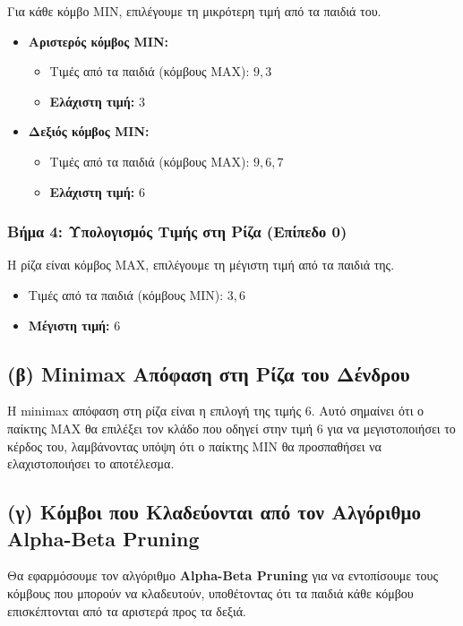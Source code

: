 \documentclass{article}
\begin{document}
Για κάθε κόμβο MIN, επιλέγουμε τη μικρότερη τιμή από τα παιδιά του.

\begin{itemize}
    \item \textbf{Αριστερός κόμβος MIN:}
    \begin{itemize}
        \item Τιμές από τα παιδιά (κόμβους MAX): \(9, 3\)
        \item \textbf{Ελάχιστη τιμή:} \(3\)
    \end{itemize}
    \item \textbf{Δεξιός κόμβος MIN:}
    \begin{itemize}
        \item Τιμές από τα παιδιά (κόμβους MAX): \(9, 6, 7\)
        \item \textbf{Ελάχιστη τιμή:} \(6\)
    \end{itemize}
\end{itemize}

\subsubsection*{Βήμα 4: Υπολογισμός Τιμής στη Ρίζα (Επίπεδο 0)}

Η ρίζα είναι κόμβος MAX, επιλέγουμε τη μέγιστη τιμή από τα παιδιά της.

\begin{itemize}
    \item Τιμές από τα παιδιά (κόμβους MIN): \(3, 6\)
    \item \textbf{Μέγιστη τιμή:} \(6\)
\end{itemize}

\subsection*{(β) Minimax Απόφαση στη Ρίζα του Δένδρου}

Η minimax απόφαση στη ρίζα είναι η επιλογή της τιμής \(6\). Αυτό σημαίνει ότι ο παίκτης MAX θα επιλέξει τον κλάδο που οδηγεί στην τιμή \(6\) για να μεγιστοποιήσει το κέρδος του, λαμβάνοντας υπόψη ότι ο παίκτης MIN θα προσπαθήσει να ελαχιστοποιήσει το αποτέλεσμα.

\subsection*{(γ) Κόμβοι που Κλαδεύονται από τον Αλγόριθμο Alpha-Beta Pruning}

Θα εφαρμόσουμε τον αλγόριθμο \textbf{Alpha-Beta Pruning} για να εντοπίσουμε τους κόμβους που μπορούν να κλαδευτούν, υποθέτοντας ότι τα παιδιά κάθε κόμβου επισκέπτονται από τα αριστερά προς τα δεξιά.
\end{document}
